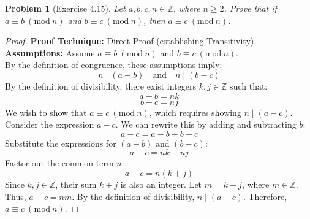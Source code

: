 \documentclass[11pt]{article}
\newtheorem{problem}{Problem}
\newcommand{\Z}{\mathbb{Z}}
\newcommand{\modulo}[1]{\ (\mathrm{mod}\ #1)}
\begin{document}
\vspace{0.5cm}

\begin{problem}[Exercise 4.15]
Let $a, b, c, n \in \Z$, where $n \geq 2$. Prove that if $a \equiv b \modulo{n}$ and $b \equiv c \modulo{n}$, then $a \equiv c \modulo{n}$.
\end{problem}
\begin{proof}
\textbf{Proof Technique:} Direct Proof (establishing Transitivity). \\
\textbf{Assumptions:} Assume $a \equiv b \modulo{n}$ and $b \equiv c \modulo{n}$. \\
By the definition of congruence, these assumptions imply:
\[ n \mid (a - b) \quad \text{and} \quad n \mid (b - c) \]
By the definition of divisibility, there exist integers $k, j \in \Z$ such that:
\[ a - b = nk \]
\[ b - c = nj \]
We wish to show that $a \equiv c \modulo{n}$, which requires showing $n \mid (a - c)$.
Consider the expression $a - c$. We can rewrite this by adding and subtracting $b$:
\[ a - c = a - b + b - c \]
Substitute the expressions for $(a - b)$ and $(b - c)$:
\[ a - c = nk + nj \]
Factor out the common term $n$:
\[ a - c = n(k + j) \]
Since $k, j \in \Z$, their sum $k + j$ is also an integer. Let $m = k + j$, where $m \in \Z$.
Thus, $a - c = nm$. By the definition of divisibility, $n \mid (a - c)$.
Therefore, $a \equiv c \modulo{n}$.
\end{proof}

\vspace{0.5cm}
\end{document}
